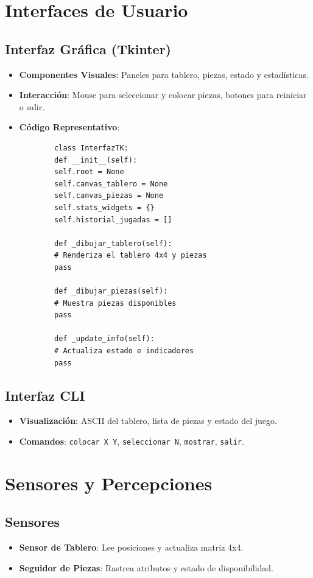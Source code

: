 \documentclass[conference]{IEEEtran}
\begin{document}
\section{Interfaces de Usuario}

\subsection{Interfaz Gráfica (Tkinter)}
\begin{itemize}
	\item \textbf{Componentes Visuales}: Paneles para tablero, piezas, estado y estadísticas.
	\item \textbf{Interacción}: Mouse para seleccionar y colocar piezas, botones para reiniciar o salir.
	\item \textbf{Código Representativo}:
	\begin{verbatim}
		class InterfazTK:
		def __init__(self):
		self.root = None
		self.canvas_tablero = None
		self.canvas_piezas = None
		self.stats_widgets = {}
		self.historial_jugadas = []
		
		def _dibujar_tablero(self):
		# Renderiza el tablero 4x4 y piezas
		pass
		
		def _dibujar_piezas(self):
		# Muestra piezas disponibles
		pass
		
		def _update_info(self):
		# Actualiza estado e indicadores
		pass
	\end{verbatim}
\end{itemize}

\subsection{Interfaz CLI}
\begin{itemize}
	\item \textbf{Visualización}: ASCII del tablero, lista de piezas y estado del juego.
	\item \textbf{Comandos}: \texttt{colocar X Y}, \texttt{seleccionar N}, \texttt{mostrar}, \texttt{salir}.
\end{itemize}

\section{Sensores y Percepciones}

\subsection{Sensores}
\begin{itemize}
	\item \textbf{Sensor de Tablero}: Lee posiciones y actualiza matriz 4x4.
	\item \textbf{Seguidor de Piezas}: Rastrea atributos y estado de disponibilidad.
\end{itemize}
\end{document}

